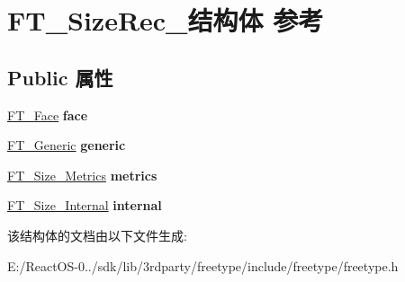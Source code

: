 \hypertarget{struct_f_t___size_rec__}{}\section{F\+T\+\_\+\+Size\+Rec\+\_\+结构体 参考}
\label{struct_f_t___size_rec__}
\subsection*{Public 属性}
\begin{DoxyCompactItemize}
\item 
\mbox{\label{struct_f_t___size_rec___a21b54fb07feaba8be23321054da98f5f}} 
\hyperlink{struct_f_t___face_rec__}{F\+T\+\_\+\+Face} {\bfseries face}
\item 
\mbox{\label{struct_f_t___size_rec___aa24520b093a9b4ba9ff388bfe7b9491d}} 
\hyperlink{struct_f_t___generic__}{F\+T\+\_\+\+Generic} {\bfseries generic}
\item 
\mbox{\label{struct_f_t___size_rec___a29a6b518d09f6cf1714d9aed01eddc01}} 
\hyperlink{struct_f_t___size___metrics__}{F\+T\+\_\+\+Size\+\_\+\+Metrics} {\bfseries metrics}
\item 
\mbox{\label{struct_f_t___size_rec___a236c47ea3138e485c29b0d7baa5cf3b6}} 
\hyperlink{struct_f_t___size___internal_rec__}{F\+T\+\_\+\+Size\+\_\+\+Internal} {\bfseries internal}
\end{DoxyCompactItemize}


该结构体的文档由以下文件生成\+:\begin{DoxyCompactItemize}
\item 
E\+:/\+React\+O\+S-\/0../sdk/lib/3rdparty/freetype/include/freetype/freetype.\+h\end{DoxyCompactItemize}
